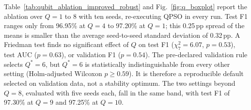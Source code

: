 \documentclass[conference]{IEEEtran}
\begin{document}
\begin{table}[!t]
\centering
\scriptsize
\caption{Selector comparison under feature budgets of 40, 20, and 10 over five seeds; the consensus mask uses ten. Ctx.: context features kept. Wins: seeds on which QPSO has the higher F1.}
\label{tab:kbudget}
\setlength{\tabcolsep}{3pt}
\end{table}






Table~\ref{tab:qubit_ablation_improved_robust}
and Fig.~\ref{fig:q_boxplot} report the ablation over $Q=1$ to 8 with
ten seeds, re-executing QPSO in every run. Test F1 ranges only from
96.95\% at $Q=4$ to 97.20\% at $Q=1$; this 0.25\,pp spread of the
means is smaller than the average seed-to-seed standard deviation of
0.32\,pp. A Friedman test finds no significant effect of $Q$ on test
F1 ($\chi^2_7=6.07$, $p=0.53$), test AUC ($p=0.63$), or validation F1
($p=0.54$). The pre-declared validation rule selects $Q^{*}=6$, but
$Q^{*}=6$ is statistically indistinguishable from every other setting
(Holm-adjusted Wilcoxon $p\ge0.59$). It is therefore a reproducible
default selected on validation data, not a stability optimum. The two
settings beyond $Q=8$, evaluated with five seeds each, fall in the same band,
with test F1 of 97.30\% at $Q=9$ and 97.25\% at $Q=10$.
\end{document}
